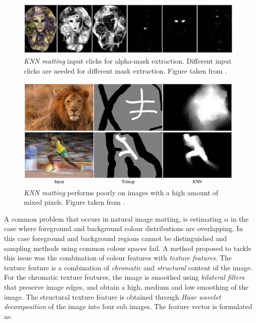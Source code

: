 \begin{figure}[t!]
\centering
\includegraphics[width=1\columnwidth]{Chapter2/2/knn_figure_2.jpg}
\caption[KNN input clicks for alpha-mask extraction]{\textit{KNN matting} input clicks for alpha-mask extraction. Different input clicks are needed for different mask extraction. Figure taken from \cite{knn}.}
\label{fig:knn-f2}
\end{figure}

\begin{figure}[t!]
\centering
\includegraphics[width=1\columnwidth]{Chapter2/2/knn_figure_3.jpg}
\caption[KNN performance on fuzzy regions.]{\textit{KNN matting} performs poorly on images with a high amount of mixed pixels. Figure taken from \cite{knn}.}
\label{fig:knn-f3}
\end{figure}

A common problem that occurs in natural image matting, is estimating $\alpha$ in the case where foreground and background colour distributions are overlapping. In this case foreground and background regions cannot be distinguished and sampling methods using common colour spaces fail. A method proposed \cite{texture} to tackle this issue was the combination of colour features with \textit{texture features}. The texture feature is a combination of \textit{chromatic} and \textit{structural} content of the image. For the chromatic texture features, the image is smoothed using \textit{bilateral filters} that preserve image edges, and obtain a high, medium and low smoothing of the image. The structural texture feature is obtained through \textit{Haar wavelet decomposition} of the image into four sub images. The feature vector is formulated as:

